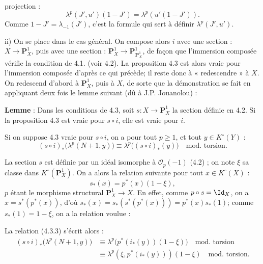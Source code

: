 projection :
\[
  \lambda^p(J',u')(1-J')=\lambda^p(u'(1-J')).
\]
Comme \(1-J'=\lambda_{-1}(J')\), c'est la formule qui sert à définir \(\lambda^p(J',u')\).

ii) On se place dans le cas général. On compose alors \(i\) avec une section : \(X\to\mathbf P_X^1\), puis avec une section : \(\mathbf P_X^1\to\mathbf P_{\mathbf P_X^1}^1\), de façon que l'immersion composée vérifie la condition de 4.1. (voir 4.2). La proposition 4.3 est alors vraie pour l'immersion composée d'après ce qui précède; il reste donc à « redescendre » à \(X\). On redescend d'abord à \(\mathbf P_X^1\), puis à \(X\), de sorte que la démonstration se fait en appliquant deux fois le lemme suivant (dû à J.P. Jouanolou) :

\textbf{Lemme} : Dans les conditions de 4.3, soit \(s:X\to\mathbf P_X^1\) la section définie en 4.2. Si la proposition 4.3 est vraie pour \(s\circ i\), elle est vraie pour \(i\).

Si on suppose 4.3 vraie pour \(s\circ i\), on a pour tout \(p\ge1\), et tout \(y\in K^\circ(Y)\) :
\begin{equation}\tag{4.3.3}
 (s\circ i)_*\bigl(\lambda^p(N+1,y)\bigr)
 \equiv
 \lambda^p\bigl((s\circ i)_*(y)\bigr)
 \quad\text{mod.\ torsion}.
\end{equation}

La section \(s\) est définie par un idéal isomorphe à \(\mathcal O_p(-1)\) (4.2) ; on note \(\xi\) sa classe dans \(K^\circ(\mathbf P_X^1)\). On a alors la relation suivante pour tout \(x\in K^\circ(X)\) :
\[
  s_*(x)=p^*(x)(1-\xi),
\]
\(p\) étant le morphisme structural \(\mathbf P_X^1\to X\). En effet, comme \(p\circ s=\Id_X\), on a \(x=s^*(p^*(x))\), d'où \(s_*(x)=s_*(s^*(p^*(x)))=p^*(x)s_*(1)\); comme \(s_*(1)=1-\xi\), on a la relation voulue :

La relation (4.3.3) s'écrit alors :
\[
\begin{aligned}
(s\circ i)_*\bigl(\lambda^p(N+1,y)\bigr)
&\equiv \lambda^p\bigl(p^*(i_*(y))(1-\xi)\bigr)\quad\text{mod.\ torsion}\\
&\equiv \lambda^p(\xi,p^*(i_*(y)))(1-\xi)\quad\text{mod.\ torsion}.
\end{aligned}
\]
